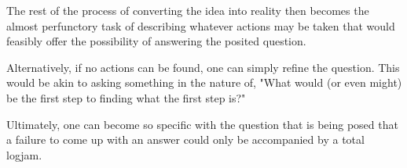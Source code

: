 \documentclass{article}
\begin{document}
\begin{multicols}{2}
The rest of the process of converting the idea into reality then becomes the almost perfunctory task of describing whatever actions may be taken that would feasibly offer the possibility of answering the posited question.

Alternatively, if no actions can be found, one can simply refine the question. This would be akin to asking something in the nature of, "What would (or even might) be the first step to finding what the first step is?"

Ultimately, one can become so specific with the question that is being posed that a failure to come up with an answer could only be accompanied by a total logjam.

\end{multicols}
\end{document}
